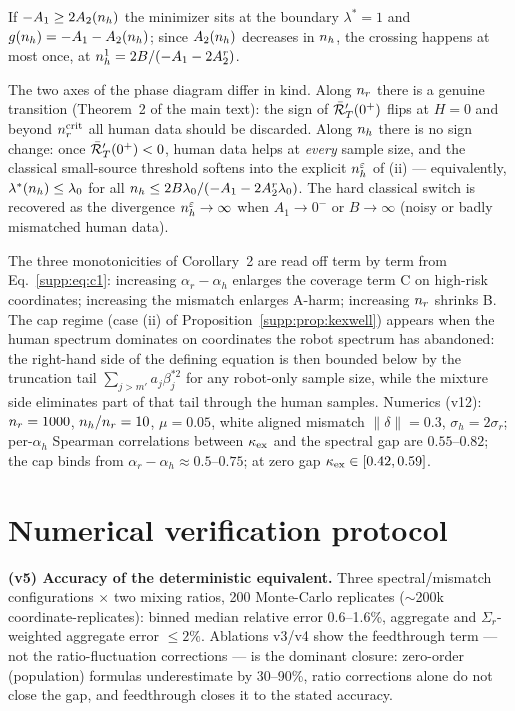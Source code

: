 If $-A_1 \ge 2A_2(n_h)$ the minimizer sits at the boundary $\lambda^* = 1$ and $g(n_h) = -A_1 - A_2(n_h)$; since $A_2(n_h)$ decreases in $n_h$, the crossing happens at most once, at $n_h^1 = 2B/(-A_1 - 2A_2^r)$.

\begin{remark}
The two axes of the phase diagram differ in kind.
Along $n_r$ there is a genuine transition (Theorem~2 of the main text): the sign of $\bar{\mathcal{R}}_T'(0^+)$ flips at $H = 0$ and beyond $n_r^{\mathrm{crit}}$ all human data should be discarded.
Along $n_h$ there is no sign change: once $\bar{\mathcal{R}}_T'(0^+) < 0$, human data helps at \emph{every} sample size, and the classical small-source threshold softens into the explicit $n_h^\varepsilon$ of (ii) --- equivalently, $\lambda^*(n_h) \le \lambda_0$ for all $n_h \le 2B\lambda_0/(-A_1 - 2A_2^r\lambda_0)$.
The hard classical switch is recovered as the divergence $n_h^\varepsilon \to \infty$ when $A_1 \to 0^-$ or $B \to \infty$ (noisy or badly mismatched human data).
\end{remark}

The three monotonicities of Corollary~2 are read off term by term from Eq.~\eqref{supp:eq:c1}: increasing $\alpha_r - \alpha_h$ enlarges the coverage term C on high-risk coordinates; increasing the mismatch enlarges A-harm; increasing $n_r$ shrinks B.
The cap regime (case (ii) of Proposition~\ref{supp:prop:kexwell}) appears when the human spectrum dominates on coordinates the robot spectrum has abandoned: the right-hand side of the defining equation is then bounded below by the truncation tail $\sum_{j>m'} a_j\beta_j^{*2}$ for any robot-only sample size, while the mixture side eliminates part of that tail through the human samples.
Numerics (v12): $n_r = 1000$, $n_h/n_r = 10$, $\mu = 0.05$, white aligned mismatch $\|\delta\| = 0.3$, $\sigma_h = 2\sigma_r$; per-$\alpha_h$ Spearman correlations between $\kappa_{\mathrm{ex}}$ and the spectral gap are $0.55$--$0.82$; the cap binds from $\alpha_r - \alpha_h \approx 0.5$--$0.75$; at zero gap $\kappa_{\mathrm{ex}} \in [0.42, 0.59]$.

\section{Numerical verification protocol}
\label{supp:numerics}

\textbf{(v5) Accuracy of the deterministic equivalent.} Three spectral/mismatch configurations $\times$ two mixing ratios, 200 Monte-Carlo replicates ($\sim$200k coordinate-replicates): binned median relative error 0.6--1.6\%, aggregate and $\Sigma_r$-weighted aggregate error $\le 2\%$.
Ablations v3/v4 show the feedthrough term --- not the ratio-fluctuation corrections --- is the dominant closure: zero-order (population) formulas underestimate by 30--90\%, ratio corrections alone do not close the gap, and feedthrough closes it to the stated accuracy.

